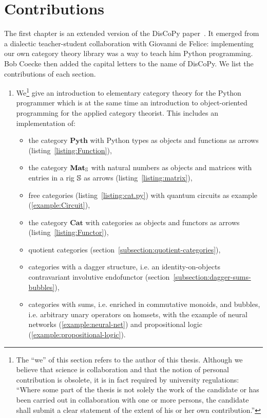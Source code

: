 
\section*{Contributions}

The first chapter is an extended version of the DisCoPy paper~\cite{FeliceEtAl20a}.
It emerged from a dialectic teacher-student collaboration with Giovanni de Felice: implementing our own category theory library was a way to teach him Python programming.
Bob Coecke then added the capital letters to the name of DisCoPy.
We list the contributions of each section.

\begin{enumerate}
\item We\footnote
{The ``we'' of this section refers to the author of this thesis.
Although we believe that science is collaboration and that the notion of personal contribution is obsolete, it is in fact required by university regulations: ``Where some part of the thesis is not solely the work of the candidate or has been carried out in collaboration with one or more persons, the candidate shall submit a clear statement of the extent of his or her own contribution.''}
give an introduction to elementary category theory for the Python programmer which is at the same time an introduction to object-oriented programming for the applied category theorist.
This includes an implementation of:
\begin{itemize}
    \item the category $\mathbf{Pyth}$ with Python types as objects and functions as arrows (listing~\ref{listing:Function}),
    \item the category $\mathbf{Mat}_\S$ with natural numbers as objects and matrices with entries in a rig $\S$ as arrows (listing~\ref{listing:matrix}),
    \item free categories (listing~\ref{listing:cat.py}) with quantum circuits as example (\ref{example:Circuit}),
    \item the category $\mathbf{Cat}$ with categories as objects and functors as arrows (listing~\ref{listing:Functor}),
    \item quotient categories (section~\ref{subsection:quotient-categories}),
    \item categories with a dagger structure, i.e. an identity-on-objects contravariant involutive endofunctor (section~\ref{subsection:dagger-sums-bubbles}),
    \item categories with sums, i.e. enriched in commutative monoids, and bubbles, i.e. arbitrary unary operators on homsets, with the example of neural networks (\ref{example:neural-net}) and propositional logic (\ref{example:propositional-logic}).
\end{itemize}


\end{enumerate}
